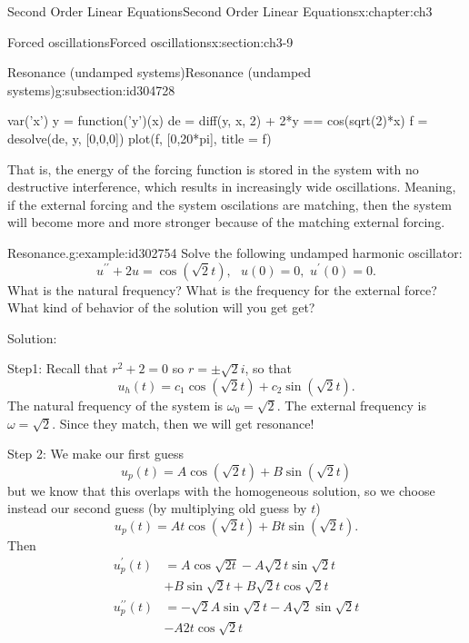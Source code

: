 \documentclass[oneside,10pt,]{book}
\numberwithin{equation}{section}
\numberwithin{equation}{section}
\newcommand{\amp}{&}
\begin{document}
\begin{chapterptx}{Second Order Linear Equations}{}{Second Order Linear Equations}{}{}{x:chapter:ch3}
\begin{sectionptx}{Forced oscillations}{}{Forced oscillations}{}{}{x:section:ch3-9}
\begin{subsectionptx}{Resonance (undamped systems)}{}{Resonance (undamped systems)}{}{}{g:subsection:id304728}
\begin{image}{0}{1}{0}
\end{image}%
 \begin{sageinput}
var('x')
y = function('y')(x)
de = diff(y, x, 2) + 2*y == cos(sqrt(2)*x)
f = desolve(de, y, [0,0,0])
plot(f, [0,20*pi], title = f)
\end{sageinput}
 That is, the energy of the forcing function is stored in the system with no destructive interference, which results in increasingly wide oscillations. Meaning, if the external forcing and the system oscilations are matching, then the system will become more and more stronger because of the matching external forcing.%
\begin{example}{Resonance.}{g:example:id302754}%
Solve the following undamped harmonic oscillator:%
\begin{equation*}
u^{\prime\prime}+2u=\cos\left(\sqrt{2}t\right),\,\,\,\,u(0)=0,\,\,u^{\prime}(0)=0.
\end{equation*}
What is the natural frequency? What is the frequency for the external force? What kind of behavior of the solution will you get get?%
\par
Solution:%
\par
Step1: Recall that \(r^{2}+2=0\) so \(r=\pm\sqrt{2}i\), so that%
\begin{equation*}
u_{h}(t)=c_{1}\cos\left(\sqrt{2}t\right)+c_{2}\sin\left(\sqrt{2}t\right).
\end{equation*}
The natural frequency of the system is \(\omega_{0}=\sqrt{2}\). The external frequency is \(\omega=\sqrt{2}\). Since they match, then we will get resonance!%
\par
Step 2: We make our first guess%
\begin{equation*}
u_{p}(t)=A\cos\left(\sqrt{2}t\right)+B\sin\left(\sqrt{2}t\right)
\end{equation*}
but we know that this overlaps with the homogeneous solution, so we choose instead our second guess (by multiplying old guess by \(t\))%
\begin{equation*}
u_{p}(t)=At\cos\left(\sqrt{2}t\right)+Bt\sin\left(\sqrt{2}t\right).
\end{equation*}
Then%
\begin{align*}
u_{p}^{\prime}(t) \amp =A\cos\sqrt{2t}-A\sqrt{2}t\sin\sqrt{2}t\\
\amp +B\sin\sqrt{2}t+B\sqrt{2}t\cos\sqrt{2}t\\
u_{p}^{\prime\prime}(t) \amp =-\sqrt{2}A\sin\sqrt{2}t-A\sqrt{2}\sin\sqrt{2}t\\
\amp -A2t\cos\sqrt{2}t\\

\end{align*}
\end{example}
\end{subsectionptx}
\end{sectionptx}
\end{chapterptx}
\end{document}
